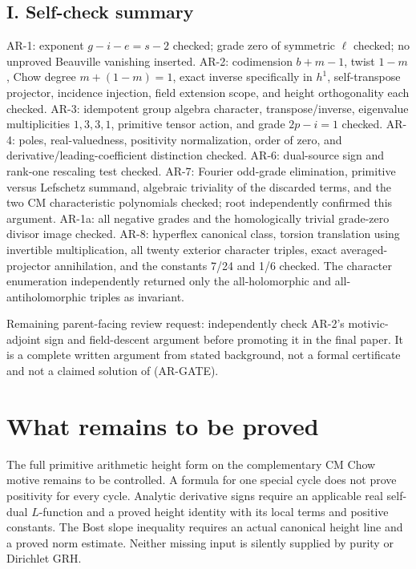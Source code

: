 \documentclass[11pt,a4paper]{article}
\begin{document}
\subsection{I. Self-check summary}\label{i.-self-check-summary}

AR-1: exponent \(g-i-e=s-2\) checked; grade zero of symmetric \(\ell\)
checked; no unproved Beauville vanishing inserted. AR-2: codimension
\(b+m-1\), twist \(1-m\), Chow degree \(m+(1-m)=1\), exact inverse
specifically in \(h^1\), self-transpose projector, incidence injection,
field extension scope, and height orthogonality each checked. AR-3:
idempotent group algebra character, transpose/inverse, eigenvalue
multiplicities \(1,3,3,1\), primitive tensor action, and grade
\(2p-i=1\) checked. AR-4: poles, real-valuedness, positivity
normalization, order of zero, and derivative/leading-coefficient
distinction checked. AR-6: dual-source sign and rank-one rescaling test
checked. AR-7: Fourier odd-grade elimination, primitive versus Lefschetz
summand, algebraic triviality of the discarded terms, and the two CM
characteristic polynomials checked; root independently confirmed this
argument. AR-1a: all negative grades and the homologically trivial
grade-zero divisor image checked. AR-8: hyperflex canonical class,
torsion translation using invertible multiplication, all twenty exterior
character triples, exact averaged-projector annihilation, and the
constants 7/24 and 1/6 checked. The character enumeration independently
returned only the all-holomorphic and all-antiholomorphic triples as
invariant.

Remaining parent-facing review request: independently check AR-2's
motivic-adjoint sign and field-descent argument before promoting it in
the final paper. It is a complete written argument from stated
background, not a formal certificate and not a claimed solution of
(AR-GATE).
\section{What remains to be proved}
The full primitive arithmetic height form on the complementary CM Chow
motive remains to be controlled. A formula for one special cycle does
not prove positivity for every cycle. Analytic derivative signs require
an applicable real self-dual $L$-function and a proved height identity
with its local terms and positive constants. The Bost slope inequality
requires an actual canonical height line and a proved norm estimate.
Neither missing input is silently supplied by purity or Dirichlet GRH.
\end{document}

